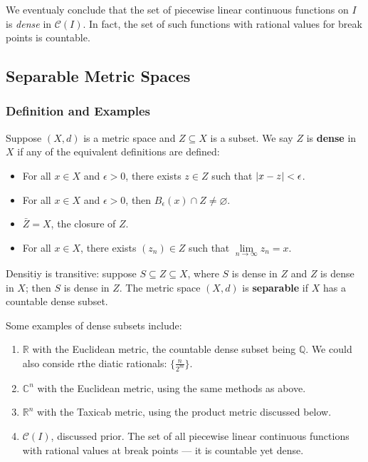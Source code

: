 \documentclass[11pt]{article}
\begin{document}
We eventualy conclude that the set of piecewise linear continuous functions on $I$ is \textit{dense} in $\mathcal{C}(I)$. In fact, the set of such functions with rational values for break points is countable. 


\subsection{Separable Metric Spaces}


\subsubsection*{Definition and Examples}

Suppose $(X, d)$ is a metric space and $Z \subseteq X$ is a subset. We say $Z$ is \textbf{dense} in $X$ if any of the equivalent definitions are defined:
\begin{itemize}
	\item For all $x \in X$ and $\epsilon > 0$, there exists $z \in Z$ such that $\abs{x - z} < \epsilon$.
	\item For all $x \in X$ and $\epsilon > 0$, then $B_{\epsilon}(x) \cap Z \ne \varnothing$.
	\item $\bar{Z} = X$, the closure of $Z$.
	\item For all $x \in X$, there exists $(z_{n}) \in Z$ such that $\lim\limits_{n \to \infty} z_{n} = x$.
\end{itemize}
Densitiy is transitive: suppose $S \subseteq Z \subseteq X$, where $S$ is dense in $Z$ and $Z$ is dense in $X$; then $S$ is dense in $Z$. The metric space $(X, d)$ is \textbf{separable} if $X$ has a countable dense subset.

\newpage

Some examples of dense subsets include:

\begin{enumerate}
	\item $\mathbb{R}$ with the Euclidean metric, the countable dense subset being $\mathbb{Q}$. We could also conside rthe diatic rationals: $\{ \tfrac{n}{2^{m}} \}$.
	\item $\mathbb{C}^{n}$ with the Euclidean metric, using the same methods as above. 
  \item $\mathbb{R}^{n}$ with the Taxicab metric, using the product metric discussed below.
  \item $\mathcal{C}(I)$, discussed prior. The set of all piecewise linear continuous functions with rational values at break points --- it is countable yet dense.
\end{enumerate}
\end{document}
